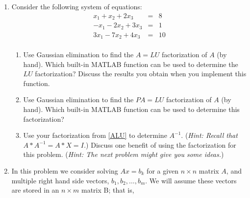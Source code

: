 \documentclass[12pt]{article}
\begin{document}
\begin{enumerate}

\item Consider the following system of equations:
\begin{eqnarray*}
x_1+x_2+2x_3 &=& 8\\
-x_1-2x_2+3x_3 &=& 1\\
3x_1-7x_2+4x_3 &=&10\\
\end{eqnarray*}
\begin{enumerate}
\item Use Gaussian elimination to find the $A=LU$ factorization of $A$ (by hand).  Which built-in MATLAB function can be used to determine the $LU$ factorization?  Discuss the results you obtain when you implement this function. \label{ALU}
\item Use Gaussian elimination to find the $PA=LU$ factorization of $A$ (by hand).  Which built-in MATLAB function can be used to determine this factorization? 
\item Use your factorization from \ref{ALU} to determine $A^{-1}.$ (\textit{Hint: Recall that $A*A^{-1}=A*X=I$.}) 
Discuss one benefit of using the factorization for this problem. ({\em Hint: The next problem might give you some ideas.})
\end{enumerate}
\item
In this problem we consider solving $Ax=b_k$ for a given $n \times n$ matrix $A$, and multiple right hand side vectors, $b_1, b_2, \ldots, b_m$. We will assume these vectors are stored in an $n \times m$ matrix B; that is,

\end{enumerate}
\end{document}
